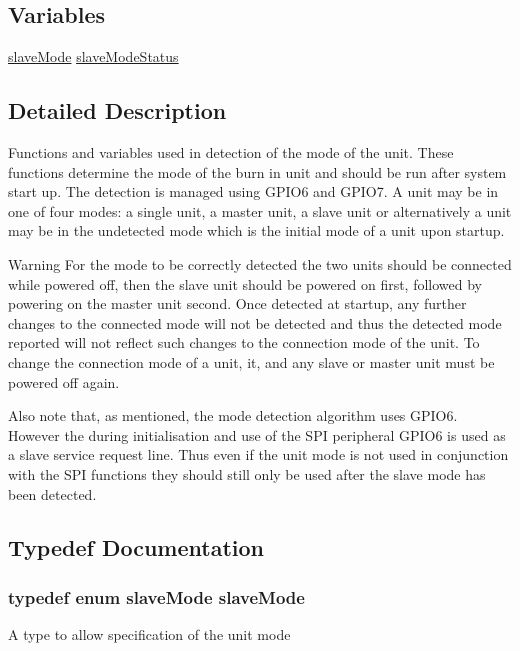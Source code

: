 \subsection*{Variables}
\begin{DoxyCompactItemize}
\item 
\hyperlink{a00047_aca06f1f459e3a5a5af6da9c575e60754}{slave\-Mode} \hyperlink{a00047_a0fdda7865dd9c0be0eb545cb8234865a}{slave\-Mode\-Status}
\end{DoxyCompactItemize}


\subsection{Detailed Description}
Functions and variables used in detection of the mode of the unit. These functions determine the mode of the burn in unit and should be run after system start up. The detection is managed using G\-P\-I\-O6 and G\-P\-I\-O7. A unit may be in one of four modes\-: a single unit, a master unit, a slave unit or alternatively a unit may be in the undetected mode which is the initial mode of a unit upon startup.

\begin{DoxyWarning}{Warning}
For the mode to be correctly detected the two units should be connected while powered off, then the slave unit should be powered on first, followed by powering on the master unit second. Once detected at startup, any further changes to the connected mode will not be detected and thus the detected mode reported will not reflect such changes to the connection mode of the unit. To change the connection mode of a unit, it, and any slave or master unit must be powered off again.
\end{DoxyWarning}
Also note that, as mentioned, the mode detection algorithm uses G\-P\-I\-O6. However the during initialisation and use of the S\-P\-I peripheral G\-P\-I\-O6 is used as a slave service request line. Thus even if the unit mode is not used in conjunction with the S\-P\-I functions they should still only be used after the slave mode has been detected. 

\subsection{Typedef Documentation}
\hypertarget{a00047_afb2b17d98c0aab4c05960f280d68084d}{
\subsubsection[{slave\-Mode}]{\setlength{\rightskip}{0pt plus 5cm}typedef enum {\bf slave\-Mode} {\bf slave\-Mode}}}\label{a00047_afb2b17d98c0aab4c05960f280d68084d}
A type to allow specification of the unit mode 

